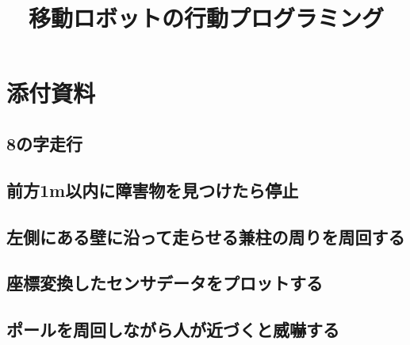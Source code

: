 \documentclass[lualatex, a4paper, base=11pt, jafont=auto, ja=standard]{bxjsreport}
\title{移動ロボットの行動プログラミング}
\author{\myname }
\begin{document}
\maketitle
\pagestyle{empty}
\tableofcontents
\newpage
\pagestyle{plain}
\setcounter{page}{1}







\pagestyle{empty}
\chapter{添付資料}
\section{8の字走行}

\newpage
\section{前方1m以内に障害物を見つけたら停止}

\newpage
\section{左側にある壁に沿って走らせる兼柱の周りを周回する}

\newpage
\section{座標変換したセンサデータをプロットする}

\newpage
\section{ポールを周回しながら人が近づくと威嚇する}

\end{document}
